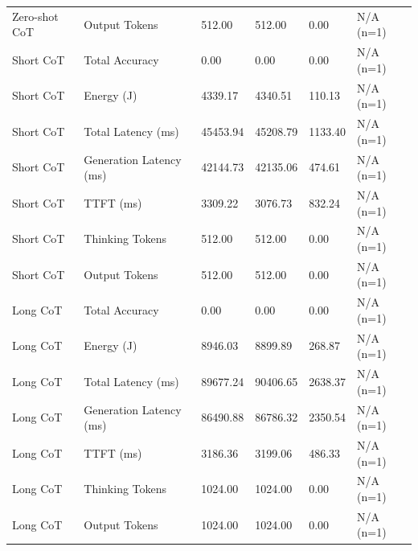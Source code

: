 \begin{table}
\begin{tabular}{llllll}
Zero-shot CoT & Output Tokens & 512.00 & 512.00 & 0.00 & N/A (n=1) \\
Short CoT & Total Accuracy & 0.00 & 0.00 & 0.00 & N/A (n=1) \\
Short CoT & Energy (J) & 4339.17 & 4340.51 & 110.13 & N/A (n=1) \\
Short CoT & Total Latency (ms) & 45453.94 & 45208.79 & 1133.40 & N/A (n=1) \\
Short CoT & Generation Latency (ms) & 42144.73 & 42135.06 & 474.61 & N/A (n=1) \\
Short CoT & TTFT (ms) & 3309.22 & 3076.73 & 832.24 & N/A (n=1) \\
Short CoT & Thinking Tokens & 512.00 & 512.00 & 0.00 & N/A (n=1) \\
Short CoT & Output Tokens & 512.00 & 512.00 & 0.00 & N/A (n=1) \\
Long CoT & Total Accuracy & 0.00 & 0.00 & 0.00 & N/A (n=1) \\
Long CoT & Energy (J) & 8946.03 & 8899.89 & 268.87 & N/A (n=1) \\
Long CoT & Total Latency (ms) & 89677.24 & 90406.65 & 2638.37 & N/A (n=1) \\
Long CoT & Generation Latency (ms) & 86490.88 & 86786.32 & 2350.54 & N/A (n=1) \\
Long CoT & TTFT (ms) & 3186.36 & 3199.06 & 486.33 & N/A (n=1) \\
Long CoT & Thinking Tokens & 1024.00 & 1024.00 & 0.00 & N/A (n=1) \\
Long CoT & Output Tokens & 1024.00 & 1024.00 & 0.00 & N/A (n=1) \\
\bottomrule
\end{tabular}
\end{table}
